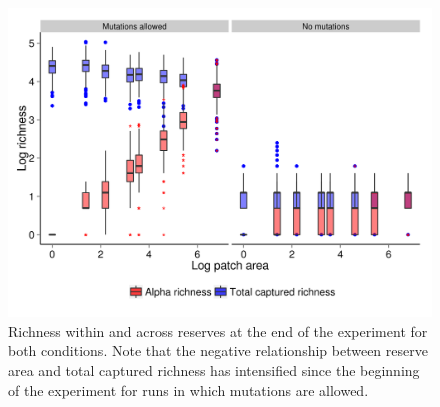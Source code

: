 \documentclass[letterpaper]{article}
\begin{document}
\begin{figure}[h]
	\centering
	\includegraphics[]{CapturedRichnessEnd.png}
    \caption{Richness within and across reserves at the end of the experiment for both conditions. Note that the negative relationship between reserve area and total captured richness has intensified since the beginning of the experiment for runs in which mutations are allowed.}
    \label{fig:capturedrichnessend}
\end{figure}
%
%
%
%
%
%
%
%
%
%
%
%
%
%
\end{document}
